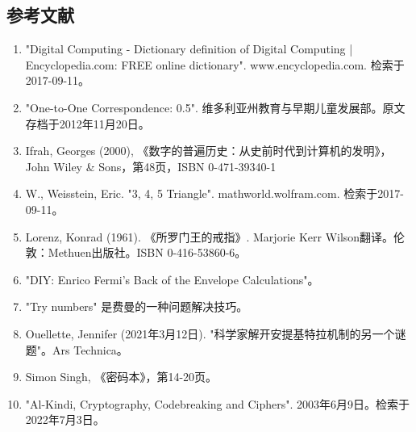 \subsection{参考文献}
\begin{enumerate}
\item "Digital Computing - Dictionary definition of Digital Computing | Encyclopedia.com: FREE online dictionary". www.encyclopedia.com. 检索于2017-09-11。
\item "One-to-One Correspondence: 0.5". 维多利亚州教育与早期儿童发展部。原文存档于2012年11月20日。
\item Ifrah, Georges (2000), 《数字的普遍历史：从史前时代到计算机的发明》，John Wiley & Sons，第48页，ISBN 0-471-39340-1
\item W., Weisstein, Eric. "3, 4, 5 Triangle". mathworld.wolfram.com. 检索于2017-09-11。
\item Lorenz, Konrad (1961). 《所罗门王的戒指》. Marjorie Kerr Wilson翻译。伦敦：Methuen出版社。ISBN 0-416-53860-6。
\item "DIY: Enrico Fermi's Back of the Envelope Calculations"。
\item "Try numbers" 是费曼的一种问题解决技巧。
\item Ouellette, Jennifer (2021年3月12日). "科学家解开安提基特拉机制的另一个谜题"。Ars Technica。
\item Simon Singh, 《密码本》，第14-20页。
\item "Al-Kindi, Cryptography, Codebreaking and Ciphers". 2003年6月9日。检索于2022年7月3日。
\end{enumerate}